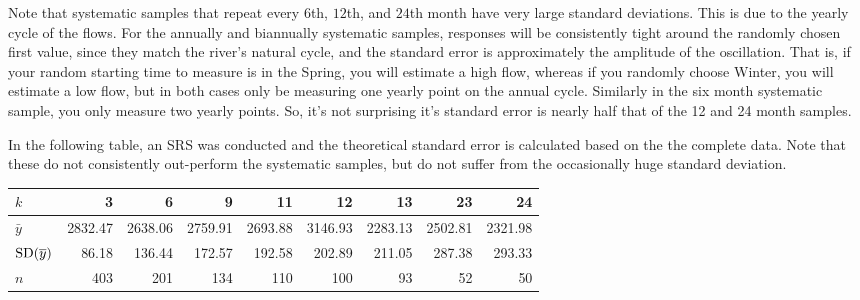 \documentclass[usenames,dvipsnames]{homework}
\begin{document}
\begin{solution}
Note that systematic samples that repeat every $6$th, $12$th, and $24$th month have
very large standard deviations.  This is due to the yearly cycle
of the flows.  For the annually and biannually systematic samples, responses
will be consistently tight around the randomly chosen first value, since they
match the river's natural cycle, and the standard
error is approximately the amplitude of the oscillation. That is, if your
random starting time to  measure is in the Spring, you will estimate a high
flow, whereas if you randomly choose Winter, you will estimate a low flow, but
in both cases only be measuring one yearly point on the annual cycle.
Similarly in the six month systematic sample, you only measure two yearly points.
So, it's not surprising it's standard error is nearly half that of the 12 and 24 month samples.

In the following table, an SRS was conducted and the theoretical standard error is calculated
based on the the complete data.  Note that these do not consistently out-perform the systematic
samples, but do not suffer from the occasionally huge standard deviation.
\begin{center}
{\small
\begin{tabular}{l|r r r r r r r r}
$k$		&         3  &       6  &      9   &      11  &    12   &      13  &      23  &      24\\ \hline
  $\bar y$	&2832.47 & 2638.06 & 2759.91 & 2693.88 & 3146.93 & 2283.13 & 2502.81 & 2321.98\\
$\mathrm{SD}(\overline y)$    &86.18  & 136.44  & 172.57  & 192.58  & 202.89  & 211.05  & 287.38  & 293.33 \\
$n$	        &   403      &  201    &  134    &  110      &  100    &    93    &    52    &    50   \\
\end{tabular}
}
\end{center}
\end{solution}

\end{document}
